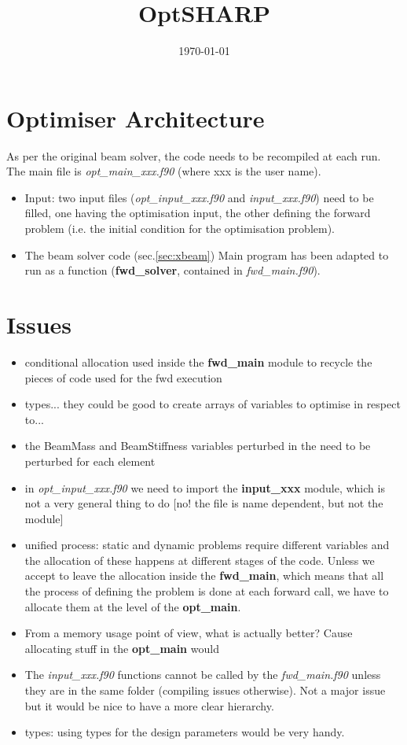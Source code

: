 \documentclass[a4paper,10pt]{article}
\title{OptSHARP}
\date{\today}
\newcommand{\bit}{\begin{itemize}}
\newcommand{\eit}{\end{itemize}}
\newcommand{\ffile}[1]{\textsl{{#1}.f90}} %
\newcommand{\ffun}[1]{\textbf{{#1}}}  %
\begin{document}
\maketitle



\section{Optimiser Architecture}
As per the original beam solver, the code needs to be recompiled at each run. The main file is \ffile{opt\_main\_xxx} (where xxx is the user name).
\bit
\item Input: two input files (\ffile{opt\_input\_xxx} and \ffile{input\_xxx}) need to be filled, one having the optimisation input, the other defining the forward problem (i.e. the initial condition for the optimisation problem).

\item The beam solver code (sec.\ref{sec:xbeam}) Main program has been adapted to run as a function (\ffun{fwd\_solver}, contained in \ffile{fwd\_main}). 


\eit



\section{Issues}
\bit
\item conditional allocation used inside the \ffun{fwd\_main} module to recycle the pieces of code used for the fwd execution
\item types... they could be good to create arrays of variables to optimise in respect to...
\item the BeamMass and BeamStiffness variables perturbed in the need to be perturbed for each element
\item in \ffile{opt\_input\_xxx} we need to import the \ffun{input\_xxx} module, which is not a very general thing to do [no! the file is name dependent, but not the module]
\item unified process: static and dynamic problems require different variables and the allocation of these happens at different stages of the code. Unless we accept to leave the allocation inside the \ffun{fwd\_main}, which means that all the process of defining the problem is done at each forward call, we have to allocate them at the level of the \ffun{opt\_main}.
\item From a memory usage point of view, what is actually better? Cause allocating stuff in the \ffun{opt\_main} would 
\item The \ffile{input\_xxx} functions cannot be called by the \ffile{fwd\_main} unless they are in the same folder (compiling issues otherwise). Not a major issue but it would be nice to have a more clear hierarchy.
\item types: using types for the design parameters would be very handy.
\eit
\end{document}

